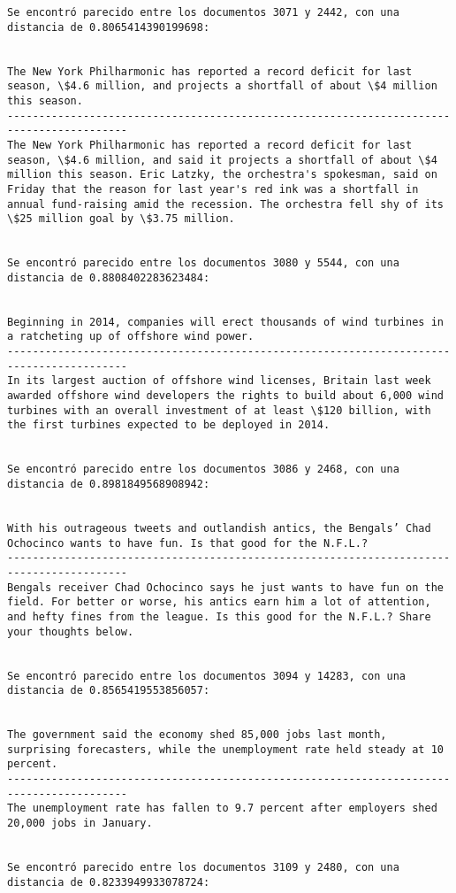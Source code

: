 \documentclass[11pt]{article}
\begin{document}
\begin{Verbatim}[commandchars=\\\{\}]
Se encontró parecido entre los documentos 3071 y 2442, con una distancia de 0.8065414390199698:


The New York Philharmonic has reported a record deficit for last season, \$4.6 million, and projects a shortfall of about \$4 million this season.
-----------------------------------------------------------------------------------------
The New York Philharmonic has reported a record deficit for last season, \$4.6 million, and said it projects a shortfall of about \$4 million this season. Eric Latzky, the orchestra's spokesman, said on Friday that the reason for last year's red ink was a shortfall in annual fund-raising amid the recession. The orchestra fell shy of its \$25 million goal by \$3.75 million.


Se encontró parecido entre los documentos 3080 y 5544, con una distancia de 0.8808402283623484:


Beginning in 2014, companies will erect thousands of wind turbines in a ratcheting up of offshore wind power.
-----------------------------------------------------------------------------------------
In its largest auction of offshore wind licenses, Britain last week awarded offshore wind developers the rights to build about 6,000 wind turbines with an overall investment of at least \$120 billion, with the first turbines expected to be deployed in 2014.


Se encontró parecido entre los documentos 3086 y 2468, con una distancia de 0.8981849568908942:


With his outrageous tweets and outlandish antics, the Bengals’ Chad Ochocinco wants to have fun. Is that good for the N.F.L.?
-----------------------------------------------------------------------------------------
Bengals receiver Chad Ochocinco says he just wants to have fun on the field. For better or worse, his antics earn him a lot of attention, and hefty fines from the league. Is this good for the N.F.L.? Share your thoughts below.


Se encontró parecido entre los documentos 3094 y 14283, con una distancia de 0.8565419553856057:


The government said the economy shed 85,000 jobs last month, surprising forecasters, while the unemployment rate held steady at 10 percent.
-----------------------------------------------------------------------------------------
The unemployment rate has fallen to 9.7 percent after employers shed 20,000 jobs in January.


Se encontró parecido entre los documentos 3109 y 2480, con una distancia de 0.8233949933078724:



\end{Verbatim}
\end{document}
